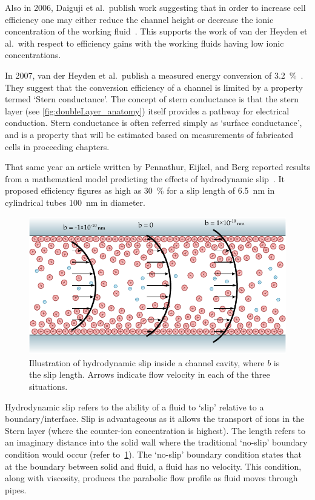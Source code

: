     Also in 2006, Daiguji et al.\ publish work suggesting that in order to increase cell efficiency one may either reduce the channel height or decrease the ionic concentration of the working fluid~\cite{Daiguji2006}.
    This supports the work of van der Heyden et al.\ with respect to efficiency gains with the working fluids having low ionic concentrations.

    In 2007, van der Heyden et al.\ publish a measured energy conversion of \SI{3.2}{\percent}~\cite{Heyden2007}.
    They suggest that the conversion efficiency of a channel is limited by a property termed `Stern conductance'.
    The concept of stern conductance is that the stern layer (see \cref{fig:doubleLayer_anatomy}) itself provides a pathway for electrical conduction.
    Stern conductance is often referred simply as `surface conductance', and is a property that will be estimated based on measurements of fabricated cells in proceeding chapters.

    That same year an article written by Pennathur, Eijkel, and Berg reported results from a mathematical model predicting the effects of hydrodynamic slip~\cite{Pennathur2007}.
    It proposed efficiency figures as high as \SI{30}{\percent} for a slip length of \SI{6.5}{\nano\meter} in cylindrical tubes \SI{100}{\nano\meter} in diameter.

    \begin{figure}
      \centering
      \includegraphics[height=6cm]{content/pt1/graphics/HydrodynamicSlip}
      \caption{\label{fig:HydrodynamicSlip}Illustration of hydrodynamic slip inside a channel cavity, where $b$ is the slip length. Arrows indicate flow velocity in each of the three situations.}
    \end{figure}

    Hydrodynamic slip refers to the ability of a fluid to `slip' relative to a boundary/interface.
    Slip is advantageous as it allows the transport of ions in the Stern layer (where the counter-ion concentration is highest).
    The length refers to an imaginary distance into the solid wall where the traditional `no-slip' boundary condition would occur (refer to~\cref{fig:HydrodynamicSlip}).
    The `no-slip' boundary condition states that at the boundary between solid and fluid, a fluid has no velocity.
    This condition, along with viscosity, produces the parabolic flow profile as fluid moves through pipes.

